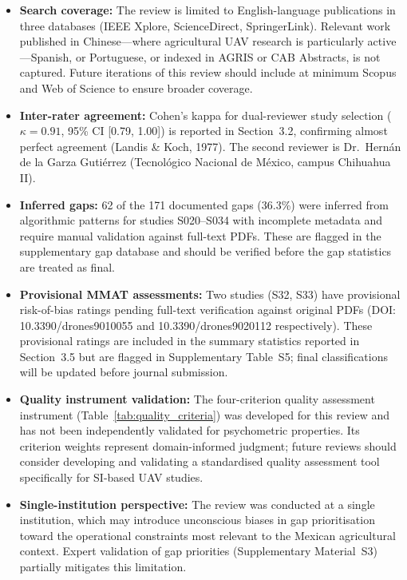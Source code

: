 \documentclass[review,3p,times]{elsarticle}
\begin{document}
\begin{itemize}
  \item \textbf{Search coverage:} The review is limited to English-language publications in three databases (IEEE Xplore, ScienceDirect, SpringerLink). Relevant work published in Chinese---where agricultural UAV research is particularly active---Spanish, or Portuguese, or indexed in AGRIS or CAB Abstracts, is not captured. Future iterations of this review should include at minimum Scopus and Web of Science to ensure broader coverage.
  \item \textbf{Inter-rater agreement:} Cohen's kappa for dual-reviewer study selection ($\kappa=0.91$, 95\% CI [0.79, 1.00]) is reported in Section~3.2, confirming almost perfect agreement (Landis \& Koch, 1977). The second reviewer is Dr.\ Hernán de la Garza Gutiérrez (Tecnológico Nacional de México, campus Chihuahua II).
  \item \textbf{Inferred gaps:} 62 of the 171 documented gaps (36.3\%) were inferred from algorithmic patterns for studies S020--S034 with incomplete metadata and require manual validation against full-text PDFs. These are flagged in the supplementary gap database and should be verified before the gap statistics are treated as final.
  \item \textbf{Provisional MMAT assessments:} Two studies (S32, S33) have provisional risk-of-bias ratings pending full-text verification against original PDFs (DOI: 10.3390/drones9010055 and 10.3390/drones9020112 respectively). These provisional ratings are included in the summary statistics reported in Section~3.5 but are flagged in Supplementary Table~S5; final classifications will be updated before journal submission.
  \item \textbf{Quality instrument validation:} The four-criterion quality assessment instrument (Table~\ref{tab:quality_criteria}) was developed for this review and has not been independently validated for psychometric properties. Its criterion weights represent domain-informed judgment; future reviews should consider developing and validating a standardised quality assessment tool specifically for SI-based UAV studies.
  \item \textbf{Single-institution perspective:} The review was conducted at a single institution, which may introduce unconscious biases in gap prioritisation toward the operational constraints most relevant to the Mexican agricultural context. Expert validation of gap priorities (Supplementary Material~S3) partially mitigates this limitation.
\end{itemize}
\end{document}

